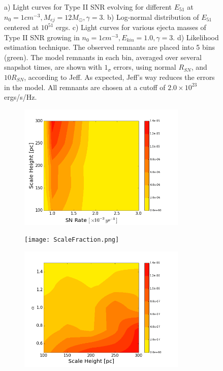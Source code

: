 \documentclass[10pt,a4paper]{article}
\begin{document}
\begin{figure}[h!]
\begin{subfigure}[b]{0.5\textwidth}
		\caption{}
	\end{subfigure}
	\caption{a) Light curves for Type II SNR evolving for different $E_{51}$ at $n_0 = 1 cm^{-3}, M_{ej} = 12 M_{\odot}, \gamma = 3$. b) Log-normal distribution of $E_{51}$ centered at $10^{51}$ ergs. c) Light curves for various ejecta masses of Type II SNR growing in $n_0 = 1 cm^{-3}, E_{kin} = 1.0, \gamma = 3$. d) Likelihood estimation technique. The observed remnants are placed into 5 bins (green). The model remnants in each bin, averaged over several snapshot times, are shown with $1_\sigma$ errors, using normal $R_{SN}$, and $10 R_{SN}$, according to Jeff. As expected, Jeff's way reduces the errors in the model. All remnants are chosen at a cutoff of $2.0 \times 10^{23}$ ergs/s/Hz.}
\end{figure}
\newpage
\begin{figure}[h!]
	\begin{subfigure}[b]{0.51\textwidth}
		\includegraphics[width=8cm]{ScaleRate.png}
		\caption{}
	\end{subfigure}
	\begin{subfigure}[b]{0.5\textwidth}
		\texttt{[image: ScaleFraction.png]}
		\caption{}
	\end{subfigure}
	\begin{subfigure}[b]{0.5\textwidth}
		\includegraphics[width=8cm]{AlphaScale.png}
		\caption{}
	\end{subfigure}

\end{figure}
\end{document}
